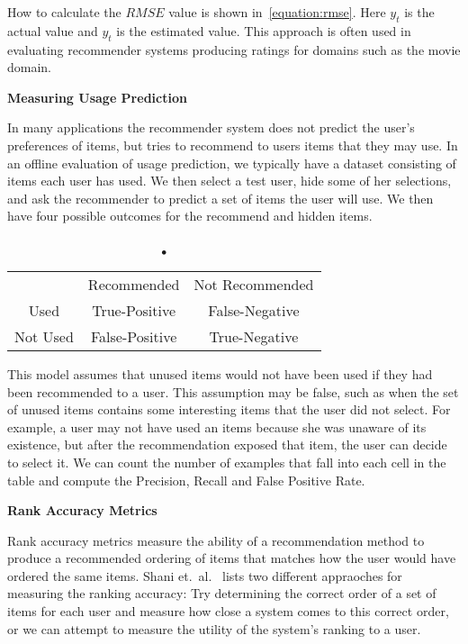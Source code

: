 \equationRMSE

How to calculate the $RMSE$ value is shown in~\ref{equation:rmse}.
Here $y_t$ is the actual value and $\hat{y_t}$ is the estimated value.
This approach is often used in evaluating recommender systems producing ratings for domains such as the movie domain.


\textbf{Measuring Usage Prediction}

In many applications the recommender system does not predict the user's
preferences of items, but tries to recommend to users items that they may use.
In an offline evaluation of usage prediction, we typically have a dataset
consisting of items each user has used. We then select a test user, hide some
of her selections, and ask the recommender to predict a set of items the user
will use. We then have four possible outcomes for the recommend and hidden
items.

\begin{table}
\caption{•}
\begin{tabular}{c c c}
\toprule
			&	Recommended		&	Not Recommended \\
Used		&	True-Positive 	&	False-Negative	\\
Not Used	&	False-Positive	&	True-Negative	\\
\bottomrule
\end{tabular}
\label{table:usageprediction}
\end{table}

This model assumes that unused items would not have been used if they had been
recommended to a user. This assumption may be false, such as when the set of
unused items contains some interesting items that the user did not select. For
example, a user may not have used an items because she was unaware of its
existence, but after the recommendation exposed that item, the user can decide
to select it. We can count the number of examples that fall into each cell in
the table and compute the Precision, Recall and False Positive Rate.

\textbf{Rank Accuracy Metrics}

Rank accuracy metrics measure the ability of a recommendation method to produce
a recommended ordering of items that matches how the user would have ordered
the same items. Shani et.\ al.~\cite{Shani2011} lists two different appraoches
for measuring the ranking accuracy: Try determining the correct order of a set
of items for each user and measure how close a system comes to this correct
order, or we can attempt to measure the utility of the system's ranking to a
user.

